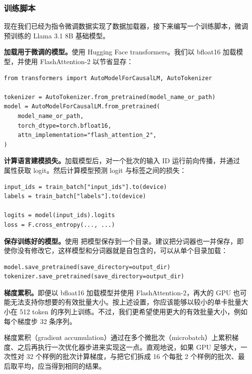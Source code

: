 \subsubsection{训练脚本}

现在我们已经为指令微调数据实现了数据加载器，接下来编写一个训练脚本，微调预训练的 Llama 3.1 8B 基础模型。

\textbf{加载用于微调的模型。}使用 Hugging Face transformers。我们以 bfloat16 加载模型，并使用 FlashAttention-2 以节省显存：

\begin{lstlisting}
from transformers import AutoModelForCausalLM, AutoTokenizer

tokenizer = AutoTokenizer.from_pretrained(model_name_or_path)
model = AutoModelForCausalLM.from_pretrained(
    model_name_or_path,
    torch_dtype=torch.bfloat16,
    attn_implementation="flash_attention_2",
)
\end{lstlisting}

\textbf{计算语言建模损失。}加载模型后，对一个批次的输入 ID 运行前向传播，并通过  属性获取 logit。然后计算模型预测 logit 与标签之间的损失：

\begin{lstlisting}
input_ids = train_batch["input_ids"].to(device)
labels = train_batch["labels"].to(device)

logits = model(input_ids).logits
loss = F.cross_entropy(..., ...)
\end{lstlisting}

\textbf{保存训练好的模型。}使用  把模型保存到一个目录。建议把分词器也一并保存，即使你没有修改它，这样模型和分词器就是自包含的，可以从单个目录加载：

\begin{lstlisting}
model.save_pretrained(save_directory=output_dir)
tokenizer.save_pretrained(save_directory=output_dir)
\end{lstlisting}

\textbf{梯度累积。}即便以 bfloat16 加载模型并使用 FlashAttention-2，再大的 GPU 也可能无法支持你想要的有效批量大小。按上述设置，你应该能够以较小的单卡批量大小在 512 token 的序列上训练。不过，我们更希望使用更大的有效批量大小，例如每个梯度步 32 条序列。

梯度累积（gradient accumulation）通过在多个微批次（microbatch）上累积梯度、之后再执行一次优化器步进来实现这一点。直观地说，如果 GPU 足够大，一次性对 32 个样例的批次计算梯度，与把它们拆成 16 个每批 2 个样例的批次、最后取平均，应当得到相同的结果。

